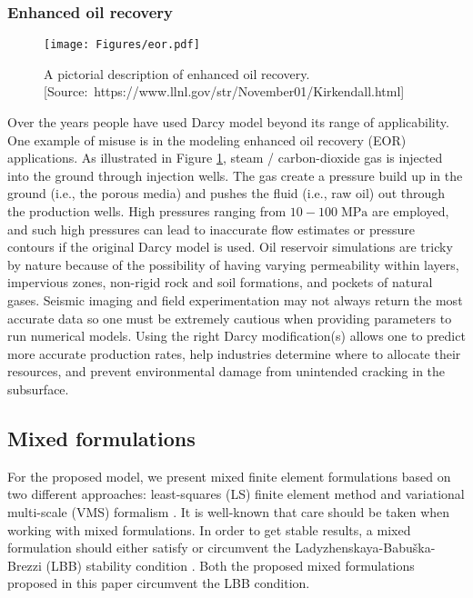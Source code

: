 \documentclass[11pt,reqno]{amsart}
\begin{document}
\subsubsection{Enhanced oil recovery}
\begin{figure}[h]
  \centering
  \texttt{[image: Figures/eor.pdf]}
  \caption{A pictorial description of enhanced oil recovery. 
  [Source:~https://www.llnl.gov/str/November01/Kirkendall.html]}
  \label{fig:Intro_eor}
\end{figure}
Over the years people have used Darcy model beyond its 
range of applicability. One example of misuse is in the 
modeling enhanced oil recovery (EOR) applications. As 
illustrated in Figure \ref{fig:Intro_eor}, steam / 
carbon-dioxide gas is injected into the ground through 
injection wells. The 
gas create a pressure build up in the ground (i.e., the 
porous media) and pushes the fluid (i.e., raw oil) out 
through the production wells. High pressures ranging from 
$10 - 100 \; \mathrm{MPa}$ are employed, and such high 
pressures can lead to inaccurate flow estimates or 
pressure contours if the original Darcy model is used. 
Oil reservoir simulations are tricky by nature because 
of the possibility of having varying permeability within 
layers, impervious zones, non-rigid rock and soil 
formations, and pockets of natural gases. Seismic 
imaging and field experimentation may not always 
return the most accurate data so one must be extremely 
cautious when providing parameters to run numerical 
models. Using the right Darcy modification(s) allows 
one to predict more accurate production rates, help 
industries determine where to allocate their resources, 
and prevent environmental damage from unintended 
cracking in the subsurface.

\subsection{Mixed formulations}
For the proposed model, we present mixed finite element 
formulations based on two different approaches: least-squares 
(LS) finite element method \cite{Jiang_LSFEM} and variational 
multi-scale (VMS) formalism \cite{Hughes_CMAME_1995_v127_p387}. 
It is well-known that care should be taken when working 
with mixed formulations. In order to get stable results, 
a mixed formulation should either satisfy or circumvent 
the Ladyzhenskaya-Babu\v ska-Brezzi (LBB) stability 
condition \cite{Brezzi_Fortin}. Both the proposed 
mixed formulations proposed in this paper circumvent 
the LBB condition. 
\end{document}
